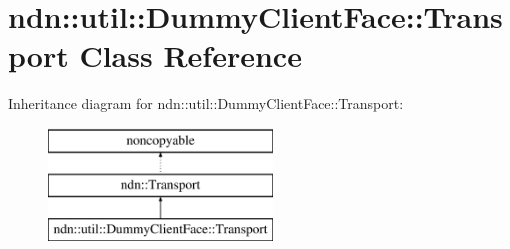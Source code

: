 \hypertarget{classndn_1_1util_1_1DummyClientFace_1_1Transport}{}\section{ndn\+:\+:util\+:\+:Dummy\+Client\+Face\+:\+:Transport Class Reference}
\label{classndn_1_1util_1_1DummyClientFace_1_1Transport}
Inheritance diagram for ndn\+:\+:util\+:\+:Dummy\+Client\+Face\+:\+:Transport\+:\begin{figure}[H]
\begin{center}
\leavevmode
\includegraphics[height=3.000000cm]{classndn_1_1util_1_1DummyClientFace_1_1Transport}
\end{center}
\end{figure}
